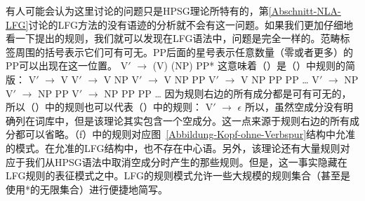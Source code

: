 有人可能会认为这里讨论的问题只是HPSG\indexlfgstartc 理论所特有的，第\ref{Abschnitt-NLA-LFG}讨论的LFG方法的没有语迹的分析就不会有这一问题。如果我们更加仔细地看一下\citet[\S~2.2]{Dalrymple2006a}提出的规则，我们就可以发现在LFG语法中，问题是完全一样的。范畴标签周围的括号表示它们可有可无。PP后面的星号表示任意数量（零或者更多）的PP可以出现在这一位置。
\ea
V$'$ $\to$ (V) (NP) PP*
\z
这意味着（）是（）中规则的简版：
\eal
\ex V$'$ $\to$ V
\ex V$'$ $\to$ V NP
\ex V$'$ $\to$ V NP PP
\ex V$'$ $\to$ V NP PP PP
\ex \ldots
\ex V$'$ $\to$ NP
\ex V$'$ $\to$ NP PP
\ex V$'$ $\to$ NP PP PP
\ex \ldots
\zl
因为规则右边的所有成分都是可有可无的，所以（）中的规则也可以代表（）中的规则：
\ea
V$'$ $\to$ $\epsilon$
\z
\addlines
所以，虽然空成分没有明确列在词库中，但是该理论其实包含一个空成分。这一点来源于规则右边的所有成分都可以省略。（f）中的规则对应图~\ref{Abbildung-Kopf-ohne-Verbspur}结构中允准的模式。在允准的LFG结构中，也不存在中心语。另外，该理论还有大量规则对应于我们从HPSG语法中取消空成分时产生的那些规则。但是，这一事实隐藏在LFG规则的表征模式之中。LFG的规则模式允许一些大规模的规则集合（甚至是使用*的无限集合）进行便捷地简写\indexlfgendc。

